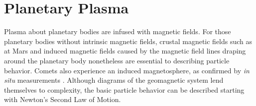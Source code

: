 \section{Planetary Plasma}
Plasma about planetary bodies are infused with magnetic fields. 
For those planetary bodies without intrinsic magnetic fields, crustal magnetic fields such as at Mars and induced magnetic fields caused by the magnetic field lines draping around the planetary body nonetheless are essential to describing particle behavior.
Comets also experience an induced magnetosphere, as confirmed by \textit{in situ} measurements \citep{israelevich1994}.
Although diagrams of the geomagnetic system lend themselves to complexity, the basic particle behavior can be described starting with Newton's Second Law of Motion.




